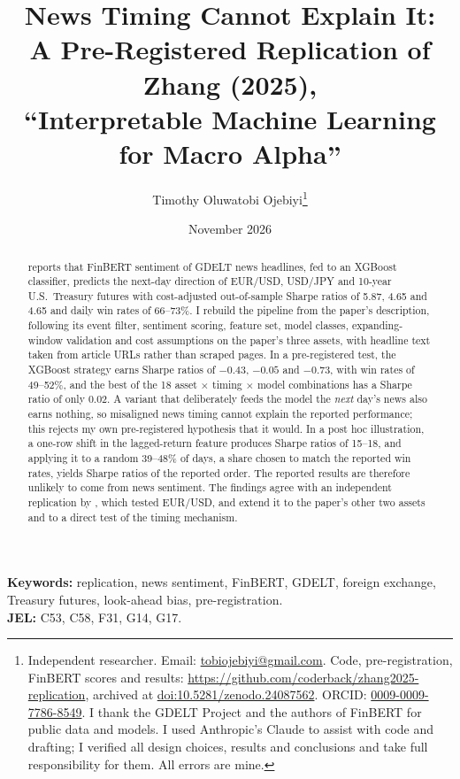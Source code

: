 \documentclass[11pt]{article}
\title{News Timing Cannot Explain It:\\ A Pre-Registered Replication of Zhang (2025),\\
``Interpretable Machine Learning for Macro Alpha''}
\author{Timothy Oluwatobi Ojebiyi\thanks{Independent researcher. Email: \href{mailto:tobiojebiyi@gmail.com}{tobiojebiyi@gmail.com}.
Code, pre-registration, FinBERT scores and results: \url{https://github.com/coderback/zhang2025-replication},
archived at \href{https://doi.org/10.5281/zenodo.24087562}{doi:10.5281/zenodo.24087562}. ORCID:
\href{https://orcid.org/0009-0009-7786-8549}{\mbox{0009-0009-7786-8549}}. I thank the GDELT Project and the authors of FinBERT for
public data and models. I used Anthropic's Claude to assist with code and drafting; I verified all design choices,
results and conclusions and take full responsibility for them. All errors are mine.}}
\date{November 2026}
\begin{document}
\maketitle

\begin{abstract}
\noindent
\citet{zhang2025} reports that FinBERT sentiment of GDELT news headlines, fed to an XGBoost classifier, predicts the
next-day direction of EUR/USD, USD/JPY and 10-year U.S.\ Treasury futures with cost-adjusted out-of-sample Sharpe
ratios of 5.87, 4.65 and 4.65 and daily win rates of 66--73\%. I rebuild the pipeline from the paper's description,
following its event filter, sentiment scoring, feature set, model classes, expanding-window validation and cost
assumptions on the paper's three assets, with headline text taken from article URLs rather than scraped pages. In a
pre-registered test, the XGBoost strategy earns Sharpe ratios of $-0.43$, $-0.05$ and $-0.73$, with win rates of
49--52\%, and the best of the 18 asset $\times$ timing $\times$ model combinations has a Sharpe ratio of only
$0.02$. A variant that deliberately feeds the model the \emph{next} day's news also earns nothing, so misaligned news
timing cannot explain the reported performance; this rejects my own pre-registered hypothesis that it would. In a
post hoc illustration, a one-row shift in the lagged-return feature produces Sharpe ratios of 15--18, and applying
it to a random 39--48\% of days, a share chosen to match the reported win rates, yields Sharpe ratios of the reported
order. The reported results are
therefore unlikely to come from news sentiment. The findings agree with an independent replication by
\citet{andrews2026}, which tested EUR/USD, and extend it to the paper's other two assets and to a direct test of the
timing mechanism.
\end{abstract}

\noindent\textbf{Keywords:} replication, news sentiment, FinBERT, GDELT, foreign exchange, Treasury futures,
look-ahead bias, pre-registration.\\
\textbf{JEL:} C53, C58, F31, G14, G17.
\end{document}
